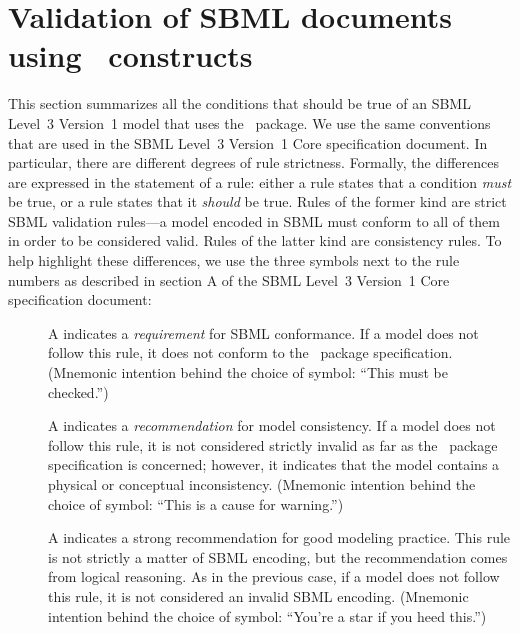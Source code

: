 
\section{Validation of SBML documents using \multi\ constructs}
\label{def:apdx-validation}

This section summarizes all the conditions that should be true of an SBML Level~3 Version~1 model that uses the \multi\ package.  We use the same conventions that are used in the SBML Level~3 Version~1 Core specification document.  In particular, there are different degrees of rule strictness.  Formally, the differences are expressed in the statement of a rule: either a rule states that a condition \emph{must} be true, or a rule states that it \emph{should} be true.  Rules of the former kind are strict SBML validation rules---a model encoded in SBML must conform to all of them in order to be considered valid.  Rules of the latter kind are consistency rules.  To help highlight these differences, we use the three symbols next to the rule numbers as described in section A of the SBML Level~3 Version~1 Core specification document: 

\begin{description}

\item[\hspace*{6.5pt}\vSymbol\vsp] A \vSymbolName indicates a \emph{requirement} for SBML conformance. If a model does not follow this rule, it does not conform to the \multi\ package specification.  (Mnemonic intention behind the choice of symbol: ``This must be checked.'')

\item[\hspace*{6.5pt}\cSymbol\csp] A \cSymbolName indicates a \emph{recommendation} for model consistency.  If a model does not follow this rule, it is not considered strictly invalid as far as the \multi\ package specification is concerned; however, it indicates that the model contains a physical or conceptual inconsistency.  (Mnemonic intention behind the choice of symbol: ``This is a cause for warning.'')

\item[\hspace*{6.5pt}\mSymbol\msp] A \mSymbolName indicates a strong recommendation for good modeling practice.  This rule is not strictly a matter of SBML encoding, but the recommendation comes from logical reasoning.  As in the previous case, if a model does not follow this rule, it is not considered an invalid SBML encoding.  (Mnemonic intention behind the choice of symbol: ``You're a star if you heed this.'')

\end{description}

